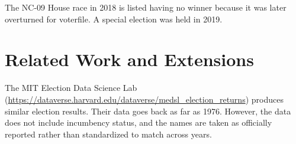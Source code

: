\documentclass[12pt]{article}
\begin{document}
The NC-09 House race in 2018 is listed having no winner because it was later overturned for voterfile. A special election was held in 2019.

	



\section{Related Work and Extensions}

The MIT Election Data Science Lab (\url{https://dataverse.harvard.edu/dataverse/medsl\_election\_returns}) produces similar election results. Their data goes back as far as 1976. However, the data does not include incumbency status, and the names are taken as officially reported rather than standardized to match across years.


\end{document}
